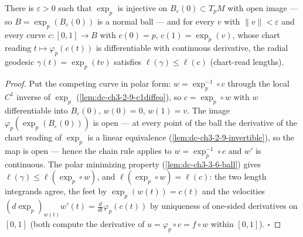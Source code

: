 \begin{lemma}
  \label{lem:dc-ch3-3-6-normal}
  \leanok
  There is $\varepsilon>0$ such that $\exp_p$ is injective on
  $B_\varepsilon(0)\subset T_pM$ with open image — so
  $B=\exp_p(B_\varepsilon(0))$ is a normal ball — and for every $v$ with
  $\|v\|<\varepsilon$ and every curve $c:[0,1]\to B$ with $c(0)=p$,
  $c(1)=\exp_p(v)$, whose chart reading $t\mapsto\varphi_p(c(t))$ is
  differentiable with continuous derivative, the radial geodesic
  $\gamma(t)=\exp_p(tv)$ satisfies $\ell(\gamma)\le\ell(c)$ (chart-read
  lengths).
\end{lemma}
\begin{proof}
  \leanok
  Put the competing curve in polar form: $w=\exp_p^{-1}\circ c$ through the
  local $C^1$ inverse of $\exp_p$ (\cref{lem:dc-ch3-2-9-c1diffeo}), so
  $c=\exp_p\circ w$ with $w$ differentiable into $B_\varepsilon(0)$,
  $w(0)=0$, $w(1)=v$. The image $\varphi_p(\exp_p(B_\varepsilon(0)))$ is open
  — at every point of the ball the derivative of the chart reading of
  $\exp_p$ is a linear equivalence (\cref{lem:dc-ch3-2-9-invertible}), so the
  map is open — hence the chain rule applies to $w=\exp_p^{-1}\circ c$ and
  $w'$ is continuous. The polar minimizing property
  (\cref{lem:dc-ch3-3-6-ball}) gives $\ell(\gamma)\le\ell(\exp_p\circ w)$,
  and $\ell(\exp_p\circ w)=\ell(c)$: the two length integrands agree, the
  feet by $\exp_p(w(t))=c(t)$ and the velocities
  $(d\exp_p)_{w(t)}w'(t)=\frac{d}{dt}\varphi_p(c(t))$ by uniqueness of
  one-sided derivatives on $[0,1]$ (both compute the derivative of
  $u=\varphi_p\circ c=f\circ w$ within $[0,1]$). $\square$
\end{proof}

